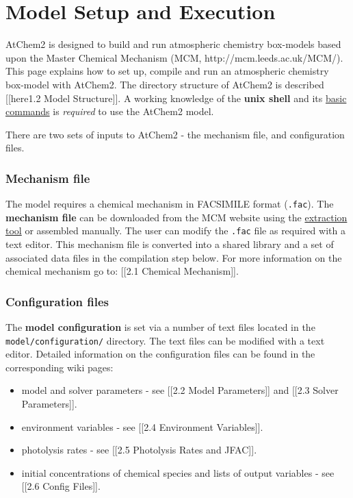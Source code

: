 \chapter{Model Setup and Execution} \label{ch:setup}

AtChem2 is designed to build and run atmospheric chemistry box-models
based upon the Master Chemical Mechanism (MCM,
http://mcm.leeds.ac.uk/MCM/). This page explains how to set up, compile
and run an atmospheric chemistry box-model with AtChem2. The directory
structure of AtChem2 is described {[}{[}here\textbar{}1.2 Model
Structure{]}{]}. A working knowledge of the \textbf{unix shell} and its
\href{https://swcarpentry.github.io/shell-novice/reference/}{basic
commands} is \emph{required} to use the AtChem2 model.

There are two sets of inputs to AtChem2 - the mechanism file, and
configuration files.

\subsection{Mechanism file} \label{mechanism-file}

The model requires a chemical mechanism in FACSIMILE format
(\texttt{.fac}). The \textbf{mechanism file} can be downloaded from the
MCM website using the
\href{http://mcm.leeds.ac.uk/MCMv3.3.1/extract.htt}{extraction tool} or
assembled manually. The user can modify the \texttt{.fac} file as
required with a text editor. This mechanism file is converted into a
shared library and a set of associated data files in the compilation
step below. For more information on the chemical mechanism go to:
{[}{[}2.1 Chemical Mechanism{]}{]}.

\subsection{Configuration files} \label{configuration-files}

The \textbf{model configuration} is set via a number of text files
located in the \texttt{model/configuration/} directory. The text files
can be modified with a text editor. Detailed information on the
configuration files can be found in the corresponding wiki pages:

\begin{itemize}
\item
  model and solver parameters - see {[}{[}2.2 Model Parameters{]}{]} and
  {[}{[}2.3 Solver Parameters{]}{]}.
\item
  environment variables - see {[}{[}2.4 Environment Variables{]}{]}.
\item
  photolysis rates - see {[}{[}2.5 Photolysis Rates and JFAC{]}{]}.
\item
  initial concentrations of chemical species and lists of output
  variables - see {[}{[}2.6 Config Files{]}{]}.
\end{itemize}

